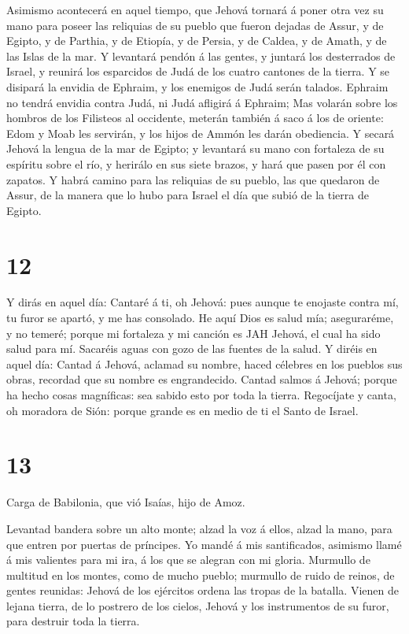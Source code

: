  Asimismo acontecerá en aquel tiempo, que Jehová tornará á
poner otra vez su mano para poseer las reliquias de su pueblo que fueron
dejadas de Assur, y de Egipto, y de Parthia, y de Etiopía, y de Persia,
y de Caldea, y de Amath, y de las Islas de la mar.  Y
levantará pendón á las gentes, y juntará los desterrados de Israel, y
reunirá los esparcidos de Judá de los cuatro cantones de la tierra.
 Y se disipará la envidia de Ephraim, y los enemigos de
Judá serán talados. Ephraim no tendrá envidia contra Judá, ni Judá
afligirá á Ephraim;  Mas volarán sobre los hombros de los
Filisteos al occidente, meterán también á saco á los de oriente: Edom y
Moab les servirán, y los hijos de Ammón les darán obediencia.
 Y secará Jehová la lengua de la mar de Egipto; y levantará
su mano con fortaleza de su espíritu sobre el río, y herirálo en sus
siete brazos, y hará que pasen por él con zapatos.  Y habrá
camino para las reliquias de su pueblo, las que quedaron de Assur, de la
manera que lo hubo para Israel el día que subió de la tierra de Egipto.

\hypertarget{section-11}{%
\section{12}\label{section-11}}

 Y dirás en aquel día: Cantaré á ti, oh Jehová: pues aunque
te enojaste contra mí, tu furor se apartó, y me has consolado.
 He aquí Dios es salud mía; aseguraréme, y no temeré; porque
mi fortaleza y mi canción es JAH Jehová, el cual ha sido salud para mí.
 Sacaréis aguas con gozo de las fuentes de la salud.
 Y diréis en aquel día: Cantad á Jehová, aclamad su nombre,
haced célebres en los pueblos sus obras, recordad que su nombre es
engrandecido.  Cantad salmos á Jehová; porque ha hecho cosas
magníficas: sea sabido esto por toda la tierra.  Regocíjate
y canta, oh moradora de Sión: porque grande es en medio de ti el Santo
de Israel.

\hypertarget{section-12}{%
\section{13}\label{section-12}}

 Carga de Babilonia, que vió Isaías, hijo de Amoz.

 Levantad bandera sobre un alto monte; alzad la voz á ellos,
alzad la mano, para que entren por puertas de príncipes.  Yo
mandé á mis santificados, asimismo llamé á mis valientes para mi ira, á
los que se alegran con mi gloria.  Murmullo de multitud en
los montes, como de mucho pueblo; murmullo de ruido de reinos, de gentes
reunidas: Jehová de los ejércitos ordena las tropas de la batalla.
 Vienen de lejana tierra, de lo postrero de los cielos,
Jehová y los instrumentos de su furor, para destruir toda la tierra.

